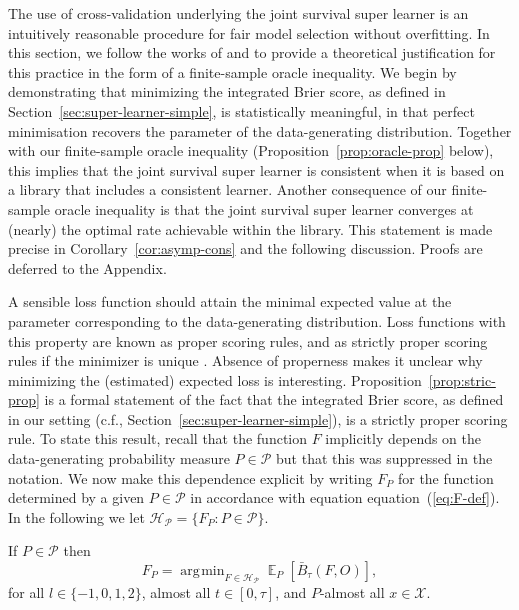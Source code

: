 \documentclass[lineno]{biometrika}
\DeclareMathOperator{\E}{\mathbb{E}} %
\newcommand{\1}{\mathds{1}}
\DeclareMathOperator*{\argmin}{\arg\!\min}
\begin{document}
The use of cross-validation underlying the joint survival super
learner is an intuitively reasonable procedure for fair model
selection without overfitting. In this section, we follow the works of
\cite{van2003unicv} and \cite{vaart2006oracle} to provide a
theoretical justification for this practice in the form of a
finite-sample oracle inequality. We begin by demonstrating that
minimizing the integrated Brier score, as defined in
Section~\ref{sec:super-learner-simple}, is statistically meaningful,
in that perfect minimisation recovers the parameter of the
data-generating distribution. Together with our finite-sample oracle
inequality (Proposition~\ref{prop:oracle-prop} below), this implies
that the joint survival super learner is consistent when it is based
on a library that includes a consistent learner. Another consequence
of our finite-sample oracle inequality is that the joint survival
super learner converges at (nearly) the optimal rate achievable within
the library. This statement is made precise in
Corollary~\ref{cor:asymp-cons} and the following discussion. Proofs
are deferred to the Appendix.

A sensible loss function should attain the minimal expected value at
the parameter corresponding to the data-generating distribution. Loss
functions with this property are known as proper scoring rules, and as
strictly proper scoring rules if the minimizer is unique
\citep{gneiting2007strictly}. Absence of properness makes it unclear
why minimizing the (estimated) expected loss is interesting.
Proposition~\ref{prop:stric-prop} is a formal statement of the fact
that the integrated Brier score, as defined in our setting (c.f.,
Section~\ref{sec:super-learner-simple}), is a strictly proper scoring
rule. To state this result, recall that the function \(F\) implicitly
depends on the data-generating probability measure \(P\in\mathcal P\)
but that this was suppressed in the notation. We now make this
dependence explicit by writing \(F_P\) for the function determined by
a given \(P \in\mathcal{P}\) in accordance with equation
equation~(\ref{eq:F-def}). In the following we let
\( \mathcal{H}_{\mathcal{P}} = \{F_P : P \in \mathcal{P}\} \).

\begin{proposition}
  \label{prop:stric-prop}
  If \(P \in\mathcal{P}\) then
  \begin{equation*}
    F_P = \argmin_{F \in \mathcal{H}_{\mathcal{P}}}
    \E_P{[\bar{B}_\tau(F, O)]}
    ,
  \end{equation*}
  for all \( l \in \{-1, 0, 1, 2 \} \), almost all
  \( t \in [0,\tau] \), and \( P \)-almost all
  \( x \in \mathcal{X} \).
\end{proposition}
\end{document}
